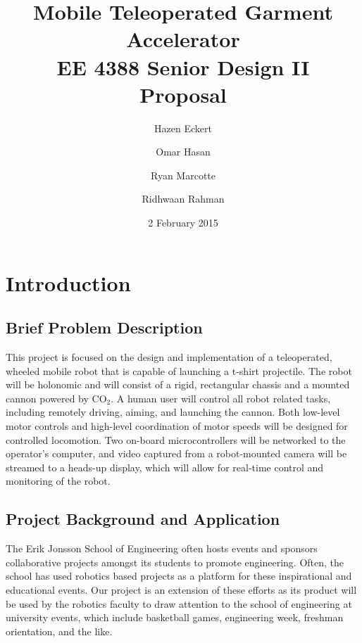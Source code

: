 \documentclass[letterpaper,12pt]{article}
\begin{document}
\title{\textbf{Mobile Teleoperated Garment Accelerator}\\EE 4388 Senior Design II\\Proposal}
\author{Hazen Eckert \and Omar Hasan \and Ryan Marcotte \and Ridhwaan Rahman}
\date{2 February 2015}
\maketitle
\newpage

\section{Introduction}
\subsection{Brief Problem Description}
This project is focused on the design and implementation of a teleoperated, wheeled mobile robot that is capable of launching a t-shirt projectile. The robot will be holonomic and will consist of a rigid, rectangular chassis and a mounted cannon powered by $\textrm{CO}_2$. A human user will control all robot related tasks, including remotely driving, aiming, and launching the cannon. Both low-level motor controls and high-level coordination of motor speeds will be designed for controlled locomotion. Two on-board microcontrollers will be networked to the operator's computer, and video captured from a robot-mounted camera will be streamed to a heads-up display, which will allow for real-time control and monitoring of the robot. 

\subsection{Project Background and Application}
The Erik Jonsson School of Engineering often hosts events and sponsors collaborative projects amongst its students to promote engineering. Often, the school has used robotics based projects as a platform for these inspirational and educational events. Our project is an extension of these efforts as its product will be used by the robotics faculty to draw attention to the school of engineering at university events, which include basketball games, engineering week, freshman orientation, and the like.
\end{document}
